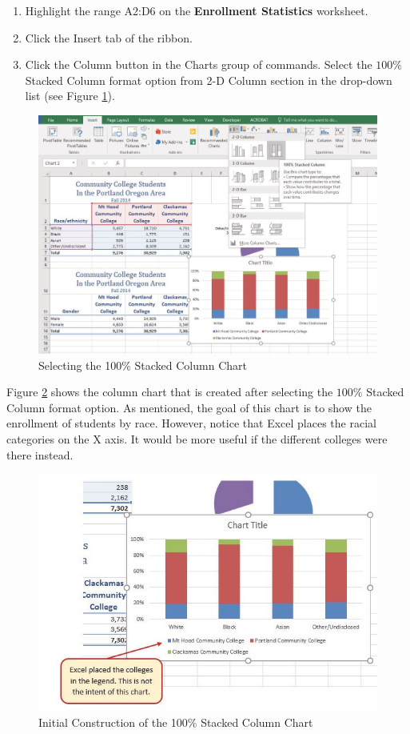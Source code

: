 \begin{enumerate}
	\item Highlight the range \textsf{A2:D6} on the \textbf{Enrollment Statistics} worksheet.
	\item Click the Insert tab of the ribbon.
	\item Click the Column button in the Charts group of commands. Select the $ 100\% $ Stacked Column format option from 2-D Column section in the drop-down list (see Figure \ref{04:fig23}).
\end{enumerate}

\begin{figure}[H]
	\centering
	\includegraphics[width=\maxwidth{.95\linewidth}]{gfx/ch04_fig23}
	\caption{Selecting the 100\% Stacked Column Chart}
	\label{04:fig23}
\end{figure}

Figure \ref{04:fig24} shows the column chart that is created after selecting the $ 100\% $ Stacked Column format option. As mentioned, the goal of this chart is to show the enrollment of students by race. However, notice that Excel places the racial categories on the X axis. It would be more useful if the different colleges were there instead.

\begin{figure}[H]
	\centering
	\includegraphics[width=\maxwidth{.95\linewidth}]{gfx/ch04_fig24}
	\caption{Initial Construction of the 100\% Stacked Column Chart}
	\label{04:fig24}
\end{figure}

